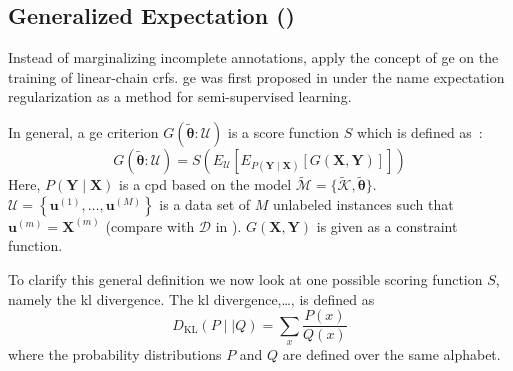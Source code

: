\subsection{Generalized Expectation ()}

Instead of marginalizing incomplete annotations, \citet{mann2008generalized} apply the concept of \acrfull{ge} on the training of linear-chain \glspl{crf}.
\Gls{ge} was first proposed in \citet{mann2007simple} under the name \gls{expectation regularization} as a method for semi-supervised learning.


In general, a \gls{ge} criterion $G(\bm{\tilde{\theta}}:\mathcal{U})$ is a score function $S$ which is defined as~\citep{mann2010generalized}:
\begin{equation}
  \label{equ:generalized-expectation}
  G(\bm{\tilde{\theta}}:\mathcal{U})=S\left(E_{\mathcal{U}}\left[E_{P(\bm{Y}\mid\bm{X})}\left[G(\bm{X},\bm{Y})\right]\right]\right)
\end{equation}
Here, $P(\bm{Y}\mid\bm{X})$ is a \gls{cpd} based on the model $\tilde{\mathcal{M}}=\{\tilde{\mathcal{K}},\bm{\tilde{\theta}}\}$.
$\mathcal{U}=\left\{\bm{u}^{(1)},\dots,\bm{u}^{(M)}\right\}$ is a data set of $M$ unlabeled instances such that $\bm{u}^{(m)}=\bm{X}^{(m)}$ (compare with $\mathcal{D}$ in ).
$G(\bm{X},\bm{Y})$ is given as a constraint function.


To clarify this general definition we now look at one possible scoring function $S$, namely the \acrshort{kl} divergence.
The \acrfull{kl} divergence,\dots, is defined as~\citep{mackay2003information}
\begin{equation}
  \label{equ:kl-divergence}
  D_{\text{KL}}(P\mid\mid Q)=\sum_x \frac{P(x)}{Q(x)}
\end{equation}
where the \glspl{probability distribution} $P$ and $Q$ are defined over the same alphabet.


